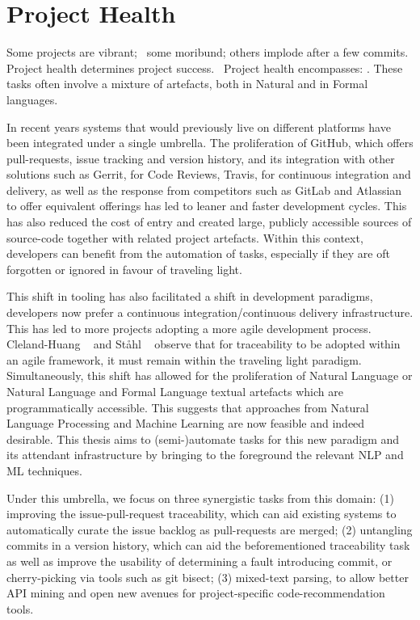 \chapter{Project Health}
\label{chapter:introduction}

Some projects are vibrant;  some moribund; others implode after a few commits.
Project health determines project success.  Project health encompasses:
. These tasks often involve a mixture of artefacts, both in
Natural and in Formal languages. 

In recent years systems that would previously live on different platforms have
been integrated under a single umbrella. The proliferation of GitHub, which
offers pull-requests, issue tracking and version history, and its integration
with other solutions such as Gerrit, for Code Reviews, Travis, for continuous
integration and delivery, as well as the response from competitors such as
GitLab and Atlassian to offer equivalent offerings has led to leaner and faster
development cycles. This has also reduced the cost of entry and created large,
publicly accessible sources of source-code together with related project
artefacts. Within this context, developers can benefit from the automation of
tasks, especially if they are oft forgotten or ignored in favour of traveling
light. 

This shift in tooling has also facilitated a shift in development paradigms,
developers now prefer a continuous integration/continuous delivery
infrastructure. This has led to more projects adopting a more agile development
process. Cleland-Huang \etal~\cite{Cleland-Huang2014} and St{\aa}hl
\etal~\cite{Stahl2017} observe that for traceability to be adopted within an
agile framework, it must remain within the traveling light paradigm.
Simultaneously, this shift has allowed for the proliferation of Natural Language
or Natural Language and Formal Language textual artefacts which are
programmatically accessible. This suggests that approaches from Natural Language
Processing and Machine Learning are now feasible and indeed desirable. This
thesis aims to (semi-)automate tasks for this new paradigm and its attendant
infrastructure by bringing to the foreground the relevant NLP and ML techniques.

Under this umbrella, we focus on three synergistic tasks from this domain: (1)
improving the issue-pull-request traceability, which can aid existing systems to
automatically curate the issue backlog as pull-requests are merged; (2)
untangling commits in a version history, which can aid the beforementioned
traceability task as well as improve the usability of determining a fault
introducing commit, or cherry-picking via tools such as git bisect; (3)
mixed-text parsing, to allow better API mining and open new avenues for
project-specific code-recommendation tools. 

